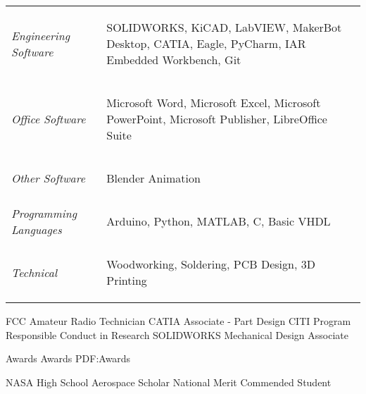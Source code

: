 \documentclass[letterpaper,ddMMMyyyy,nonstopmode]{simpleresumecv}
\newcommand{\tableWidth}{23.5em}
\begin{document}
\begin{Body}

		\def\arraystretch{0}%
		\hspace*{-0.8em}
		\begin{tabular}[t]{p{5em} p{\tableWidth}}
			\textit{Engineering Software} &
			\begin{Detail}
				SOLIDWORKS, KiCAD, LabVIEW, MakerBot Desktop, CATIA, Eagle, PyCharm, IAR Embedded Workbench, Git
			\end{Detail}\\
			\textit{Office Software} &
			\begin{Detail}
				Microsoft Word, Microsoft Excel, Microsoft PowerPoint, Microsoft Publisher, LibreOffice Suite
			\end{Detail}\\
			\textit{Other Software} &
			\begin{Detail}
				Blender Animation \newline
			\end{Detail}\\
			\textit{Programming Languages} &
			\begin{Detail}
				Arduino, Python, MATLAB, C, Basic VHDL\newline
			\end{Detail}\\
			\textit{Technical}&
			\begin{Detail}
				Woodworking, Soldering, PCB Design, 3D Printing
			\end{Detail}
		\end{tabular}

	\Entry FCC Amateur Radio Technician
	\Entry CATIA Associate - Part Design
	\Entry CITI Program Responsible Conduct in Research
	\Entry SOLIDWORKS Mechanical Design Associate


	\Section
	{Awards}
	{Awards}
	{PDF:Awards}

	\Entry NASA High School Aerospace Scholar
	\Entry National Merit Commended Student
\end{Body}
\end{document}
